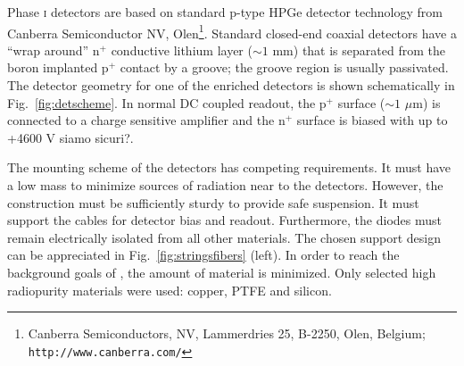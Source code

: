 Phase \textsc{i} detectors are based on standard p-type HPGe detector technology from Canberra Semiconductor NV, Olen\footnote{Canberra Semiconductors, NV, Lammerdries 25, B-2250, Olen, Belgium; \texttt{http://www.canberra.com/}}. Standard closed-end coaxial detectors have a ``wrap around'' $\text{n}^+$ conductive lithium layer ($\sim1$ mm) that is separated from the boron implanted $\text{p}^+$ contact by a groove; the groove region is usually passivated. The detector geometry for one of the enriched detectors is shown schematically in Fig.~\ref{fig:detscheme}. In normal DC coupled readout, the p$^+$ surface ($\sim1$ $\mu$m) is connected to a charge sensitive amplifier and the n$^+$ surface is biased with up to +4600 V {\color{red}siamo sicuri?}.

The mounting scheme of the detectors has competing requirements. It must have a low mass to minimize sources of radiation near to the detectors. However, the construction must be sufficiently sturdy to provide safe suspension. It must support the cables for detector bias and readout. Furthermore, the diodes must remain electrically isolated from all other materials. The chosen support design can be appreciated in Fig.~\ref{fig:stringsfibers} (left). In order to reach the background goals of {\gerda}, the amount of material is minimized. Only selected high radiopurity materials were used: copper, PTFE and silicon.

